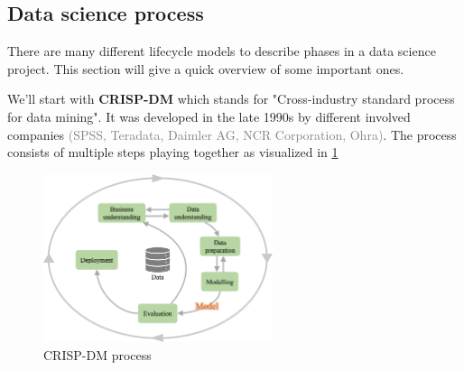
\subsection{Data science process}
There are many different lifecycle models to describe phases in a data science project. This section will give a quick overview of some important ones.


We'll start with \textbf{CRISP-DM} which stands for "Cross-industry standard process for data mining". It was developed in the late 1990s by different involved companies \textcolor{gray}{\footnotesize(SPSS, Teradata, Daimler AG, NCR Corporation, Ohra)}. The process consists of multiple steps playing together as visualized in \ref{fig:1_crisp_dm}

\begin{figure}[H]
  \centering
  \includegraphics[width=0.6\textwidth]{assets/basics/crisp-dm.png}
  \caption{CRISP-DM process}
  \label{fig:1_crisp_dm}
\end{figure}

